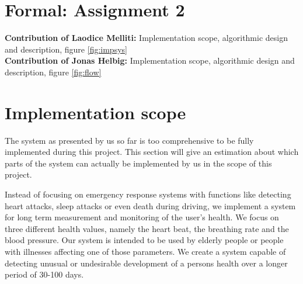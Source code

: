 \section{Formal: Assignment 2}
\textbf{Contribution of Laodice Melliti:} Implementation scope, algorithmic design and description, figure \ref{fig:impsys}\\
\textbf{Contribution of Jonas Helbig:}  Implementation scope, algorithmic design and description, figure \ref{fig:flow}\\
\section{Implementation scope}
\indent					%
\indent
The system as presented by us so far is too comprehensive to be fully implemented during this project. This section will give an estimation about which parts of the system can actually be implemented by us in the scope of this project.

Instead of focusing on emergency response systems with functions like detecting heart attacks, sleep attacks or even death during driving, we implement a system for long term measurement and monitoring of the user's health.
We focus on three different health values, namely the heart beat, the breathing rate and the blood pressure. Our system is intended to be used by elderly people or people with illnesses affecting one of those parameters. 
We create a system capable of detecting unusual or undesirable development of a persons health over a longer period of 30-100 days.

